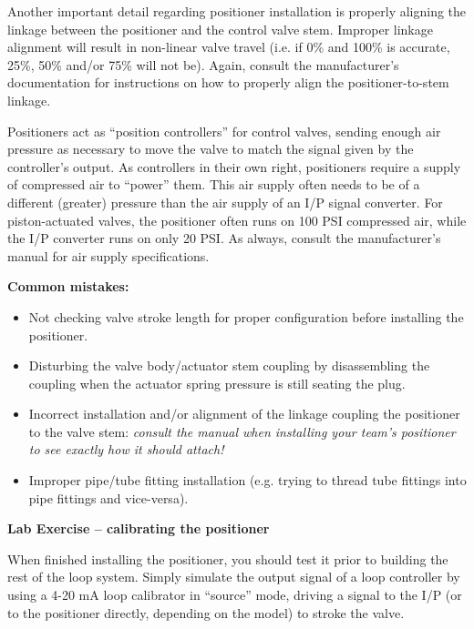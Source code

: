 \begin{itemize}
Another important detail regarding positioner installation is properly aligning the linkage between the positioner and the control valve stem.  Improper linkage alignment will result in non-linear valve travel (i.e. if 0\% and 100\% is accurate, 25\%, 50\% and/or 75\% will not be).  Again, consult the manufacturer's documentation for instructions on how to properly align the positioner-to-stem linkage.

\vskip 10pt

Positioners act as ``position controllers'' for control valves, sending enough air pressure as necessary to move the valve to match the signal given by the controller's output.  As controllers in their own right, positioners require a supply of compressed air to ``power'' them.  This air supply often needs to be of a different (greater) pressure than the air supply of an I/P signal converter.  For piston-actuated valves, the positioner often runs on 100 PSI compressed air, while the I/P converter runs on only 20 PSI.  As always, consult the manufacturer's manual for air supply specifications.

\vskip 10pt

{\bf Common mistakes:}

\begin{itemize}
\item{} Not checking valve stroke length for proper configuration before installing the positioner.
\item{} Disturbing the valve body/actuator stem coupling by disassembling the coupling when the actuator spring pressure is still seating the plug.
\item{} Incorrect installation and/or alignment of the linkage coupling the positioner to the valve stem: {\it consult the manual when installing your team's positioner to see exactly how it should attach!}
\item{} Improper pipe/tube fitting installation (e.g. trying to thread tube fittings into pipe fittings and vice-versa).
\end{itemize}




\vfil \eject

\noindent
{\bf Lab Exercise -- calibrating the positioner}

\vskip 5pt

When finished installing the positioner, you should test it prior to building the rest of the loop system.  Simply simulate the output signal of a loop controller by using a 4-20 mA loop calibrator in ``source'' mode, driving a signal to the I/P (or to the positioner directly, depending on the model) to stroke the valve.  


\end{itemize}
